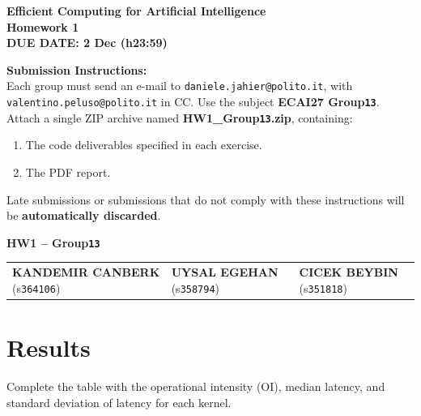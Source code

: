 \documentclass[a4paper,11pt]{article}
\begin{document}
\begin{tcolorbox}[
    colback=white,
    colframe=black,
    width=\textwidth,
    arc=3mm,
    boxrule=1pt
]
\begin{center}
    \Large \textbf{Efficient Computing for Artificial Intelligence}\\[3pt]
    \large \textbf{Homework 1}\\[5pt]
    \textbf{\colorbox{yellow!30}{DUE DATE: 2 Dec (h23:59)}}\\[8pt]
\end{center}

\textbf{Submission Instructions:}\\[3pt]

Each group must send an e-mail to
\texttt{daniele.jahier@polito.it}, with
\texttt{valentino.peluso@polito.it} in CC.
Use the subject
\textbf{ECAI27 Group\texttt{13}}.\\[3pt]

Attach a single ZIP archive named
\textbf{HW1\_Group\texttt{13}.zip}, containing:
\begin{enumerate}
    \item The code deliverables specified in each exercise.
    \item The PDF report.
\end{enumerate}

Late submissions or submissions that do not comply with these
instructions will be \textbf{automatically discarded}.
\end{tcolorbox}

\vspace{0.5cm} %

\begin{center}
\Large \textbf{HW1 – Group\texttt{13}}\\[10pt]

{\footnotesize
\begin{tabular}{lll}
\textbf{KANDEMIR CANBERK} (s\texttt{364106}) & \textbf{UYSAL EGEHAN} (s\texttt{358794}) & \textbf{CICEK BEYBIN} (s\texttt{351818}) \\
\end{tabular}
}
\end{center}

\section*{Results}

Complete the table with the operational intensity (OI), median latency,
and standard deviation of latency for each kernel.
\end{document}
